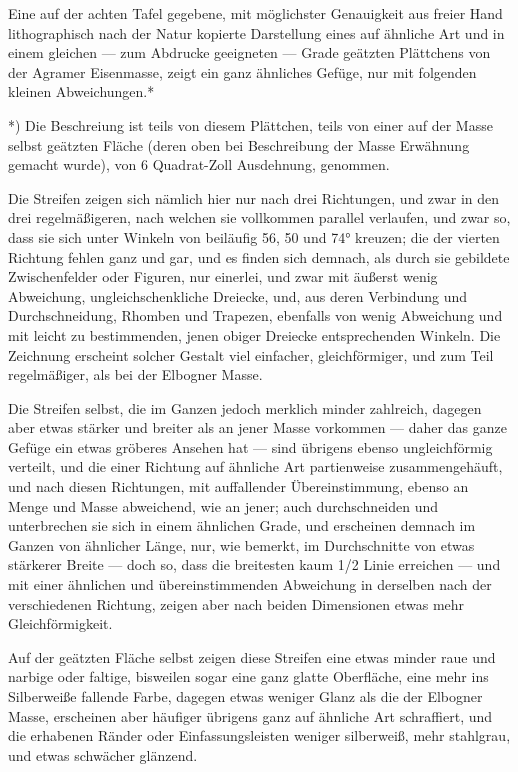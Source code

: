 \documentclass[a4paper, 11pt, oneside, german]{article}
\begin{document}
Eine auf der achten Tafel gegebene, mit möglichster Genauigkeit aus freier Hand lithographisch nach der Natur kopierte Darstellung eines auf ähnliche Art und in einem gleichen --- zum Abdrucke geeigneten --- Grade geätzten Plättchens von der Agramer Eisenmasse, zeigt ein ganz ähnliches Gefüge, nur mit folgenden kleinen Abweichungen.*

*) Die Beschreiung ist teils von diesem Plättchen, teils von einer auf der Masse selbst geätzten Fläche (deren oben bei Beschreibung der Masse Erwähnung gemacht wurde), von 6 Quadrat-Zoll Ausdehnung, genommen.

Die Streifen zeigen sich nämlich hier nur nach drei Richtungen, und zwar in den drei regelmäßigeren, nach welchen sie vollkommen parallel verlaufen, und zwar so, dass sie sich unter Winkeln von beiläufig 56, 50 und 74° kreuzen; die der vierten Richtung fehlen ganz und gar, und es finden sich demnach, als durch sie gebildete Zwischenfelder oder Figuren, nur einerlei, und zwar mit äußerst wenig Abweichung, ungleichschenkliche Dreiecke, und, aus deren Verbindung und Durchschneidung, Rhomben und Trapezen, ebenfalls von wenig Abweichung und mit leicht zu bestimmenden, jenen obiger Dreiecke entsprechenden Winkeln. Die Zeichnung erscheint solcher Gestalt viel einfacher, gleichförmiger, und zum Teil regelmäßiger, als bei der Elbogner Masse.

Die Streifen selbst, die im Ganzen jedoch merklich minder zahlreich, dagegen aber etwas stärker und breiter als an jener Masse vorkommen --- daher das ganze Gefüge ein etwas gröberes Ansehen hat --- sind übrigens ebenso ungleichförmig verteilt, und die einer Richtung auf ähnliche Art partienweise zusammengehäuft, und nach diesen Richtungen, mit auffallender Übereinstimmung, ebenso an Menge und Masse abweichend, wie an jener; auch durchschneiden und unterbrechen sie sich in einem ähnlichen Grade, und erscheinen demnach im Ganzen von ähnlicher Länge, nur, wie bemerkt, im Durchschnitte von etwas stärkerer Breite --- doch so, dass die breitesten kaum 1/2 Linie erreichen --- und mit einer ähnlichen und übereinstimmenden Abweichung in derselben nach der verschiedenen Richtung, zeigen aber nach beiden Dimensionen etwas mehr Gleichförmigkeit.

Auf der geätzten Fläche selbst zeigen diese Streifen eine etwas minder raue und narbige oder faltige, bisweilen sogar eine ganz glatte Oberfläche, eine mehr ins Silberweiße fallende Farbe, dagegen etwas weniger Glanz als die der Elbogner Masse, erscheinen aber häufiger übrigens ganz auf ähnliche Art schraffiert, und die erhabenen Ränder oder Einfassungsleisten weniger silberweiß, mehr stahlgrau, und etwas schwächer glänzend.
\end{document}
